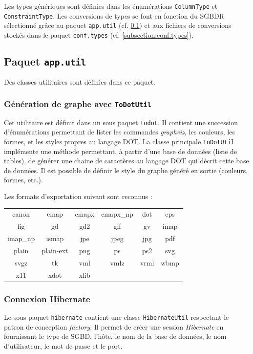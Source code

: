 Les types génériques sont définies dans les énumérations \texttt{ColumnType} et \texttt{ConstraintType}. Les conversions de types se font en fonction du SGBDR sélectionné grâce au paquet \texttt{app.util} (cf. \ref{subsection:app.util}) et aux fichiers de conversions stockés dans le paquet \texttt{conf.types} (cf. \ref{subsection:conf.types}).

\subsection{Paquet \texttt{app.util}}
\label{subsection:app.util}

Des classes utilitaires sont définies dans ce paquet.

\subsubsection{Génération de graphe avec \texttt{ToDotUtil}}
\label{section:ToDotUtil}
Cet utilitaire est définit dans un sous paquet \texttt{todot}. Il contient une succession d'énumérations permettant de lister les commandes \emph{graphviz}, les couleurs, les formes, et les styles propres au langage DOT.
La classe principale \texttt{ToDotUtil} implémente une méthode permettant, à partir d'une base de données (liste de tables), de générer une chaine de caractères au langage DOT qui décrit cette base de données. Il est possible de définir le style du graphe généré en sortie (couleurs, formes, etc.).

Les formats d'exportation suivant sont reconnus : 

\begin{center}
\begin{tabular}{c c c c c c}
canon&cmap&cmapx&cmapx\_np&dot&eps \\
fig & gd & gd2 & gif & gv & imap \\
imap\_np & ismap & jpe & jpeg & jpg & pdf \\
plain & plain-ext & png & ps & ps2 & svg \\
svgz & tk & vml & vmlz & vrml & wbmp \\
x11 & xdot & xlib & & & \\
\end{tabular}
\end{center}

\subsubsection{Connexion Hibernate}
Le sous paquet \texttt{hibernate} contient une classe \texttt{HibernateUtil} respectant le patron de conception \emph{factory}. Il permet de créer une session \emph{Hibernate} en fournissant le type de SGBD, l'hôte, le nom de la base de données, le nom d'utilisateur, le mot de passe et le port.


